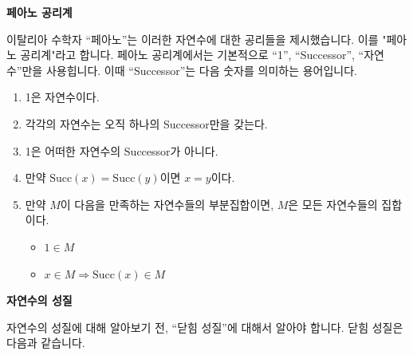 \newpage

\begin{flushleft}
    {\textcolor{subheader}{{\LARGE\textbf{페아노 공리계}}}}
\end{flushleft}

\begin{flushleft}
    이탈리아 수학자 “페아노”는 이러한 자연수에 대한 공리들을 제시했습니다. 이를 "페아노 공리계"라고 합니다. 페아노 공리계에서는 기본적으로 “1”, “Successor”, “자연수”만을 사용힙니다. 이때 “Successor”는 다음 숫자를 의미하는 용어입니다.
\end{flushleft}

\begin{tcolorbox}[colback = white, colframe = Axiom, title = \textmd{공리: 페아노 공리계}]
    \begin{enumerate}
        \item 1은 자연수이다.
        \item 각각의 자연수는 오직 하나의 Successor만을 갖는다.
        \item 1은 어떠한 자연수의 Successor가 아니다.
        \item 만약 $\text{Succ}(x) = \text{Succ}(y)$이면 $x = y$이다.
        \item 만약 $M$이 다음을 만족하는 자연수들의 부분집합이면, $M$은 모든 자연수들의 집합이다.
        \begin{itemize}
            \item $1 \in M$
            \item $x \in M \Rightarrow \text{Succ}(x) \in M$
        \end{itemize}
    \end{enumerate}
\end{tcolorbox}
\bigskip
\begin{flushleft}
    {\textcolor{subheader}{{\LARGE\textbf{자연수의 성질}}}}
\end{flushleft}

\begin{flushleft}
    자연수의 성질에 대해 알아보기 전, “닫힘 성질”에 대해서 알아야 합니다. 닫힘 성질은 다음과 같습니다.
\end{flushleft}

